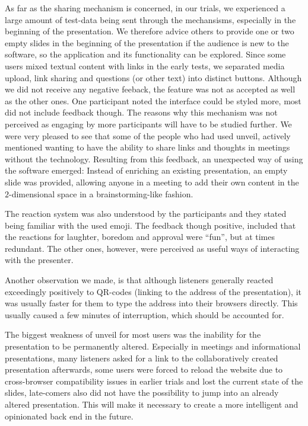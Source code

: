As far as the sharing mechanism is concerned, in our trials, we experienced a large amount of test-data being sent through the mechansisms, especially in the beginning of the presentation. We therefore advice others to provide one or two empty slides in the beginning of the presentation if the audience is new to the software, so the application and its functionality can be explored. Since some users mixed textual content with links in the early tests, we separated media upload, link sharing and questions (or other text) into distinct buttons. Although we did not receive any negative feeback, the feature was not as accepted as well as the other ones. One participant noted the interface could be styled more, most did not include feedback though. The reasons why this mechanism was not perceived as engaging by more participants will have to be studied further.
We were very pleased to see that some of the people who had used unveil, actively mentioned wanting to have the ability to share links and thoughts in meetings without the technology. Resulting from this feedback, an unexpected way of using the software emerged: Instead of enriching an existing presentation, an empty slide was provided, allowing anyone in a meeting to add their own content in the $2$-dimensional space in a brainstorming-like fashion.

The reaction system was also understood by the participants and they stated being familiar with the used emoji. The feedback though positive, included that the reactions for laughter, boredom and approval were ``fun'', but at times redundant. The other ones, however, were perceived as useful ways of interacting with the presenter.

Another observation we made, is that although listeners generally reacted exceedingly positively to QR-codes (linking to the address of the presentation), it was usually faster for them to type the address into their browsers directly. This usually caused a few minutes of interruption, which should be accounted for.

The biggest weakness of unveil for most users was the inability for the presentation to be permanently altered. Especially in meetings and informational presentations, many listeners asked for a link to the collaboratively created presentation afterwards, some users were forced to reload the website due to cross-browser compatibility issues in earlier trials and lost the current state of the slides, late-comers also did not have the possibility to jump into an already altered presentation. This will make it necessary to create a more intelligent and opinionated back end in the future.

